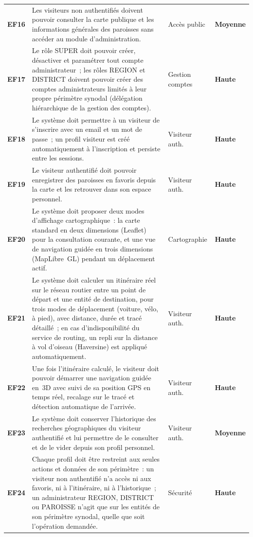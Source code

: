 \documentclass[12pt, a4paper]{report}
\begin{document}
\begin{longtable}{%
  >{\bfseries\color{eccdarkgreen}}m{1.2cm}
  m{7.8cm}
  m{3.5cm}
  >{\centering\arraybackslash\bfseries}m{1.7cm}}
EF16 & Les visiteurs non authentifiés doivent pouvoir consulter la carte
  publique et les informations générales des paroisses sans accéder au module
  d'administration. & Accès public & Moyenne \\
\rowcolor{eeclightgreen!60}
EF17 & Le rôle SUPER doit pouvoir créer, désactiver et paramétrer tout
  compte administrateur~; les rôles REGION et DISTRICT doivent pouvoir
  créer des comptes administrateurs limités à leur propre périmètre
  synodal (délégation hiérarchique de la gestion des comptes). &
  Gestion comptes & Haute \\
EF18 & Le système doit permettre à un visiteur de s'inscrire avec un email
  et un mot de passe~; un profil visiteur est créé automatiquement à
  l'inscription et persiste entre les sessions. &
  Visiteur auth. & Haute \\
\rowcolor{eeclightgreen!60}
EF19 & Le visiteur authentifié doit pouvoir enregistrer des paroisses en
  favoris depuis la carte et les retrouver dans son espace personnel. &
  Visiteur auth. & Haute \\
EF20 & Le système doit proposer deux modes d'affichage cartographique~: la
  carte standard en deux dimensions (Leaflet) pour la consultation courante,
  et une vue de navigation guidée en trois dimensions (MapLibre~GL) pendant
  un déplacement actif. & Cartographie & Haute \\
\rowcolor{eeclightgreen!60}
EF21 & Le système doit calculer un itinéraire réel sur le réseau routier
  entre un point de départ et une entité de destination, pour trois modes
  de déplacement (voiture, vélo, à pied), avec distance, durée et tracé
  détaillé~; en cas d'indisponibilité du service de routing, un repli sur
  la distance à vol d'oiseau (Haversine) est appliqué automatiquement. &
  Visiteur auth. & Haute \\
EF22 & Une fois l'itinéraire calculé, le visiteur doit pouvoir démarrer une
  navigation guidée en~3D avec suivi de sa position GPS en temps réel,
  recalage sur le tracé et détection automatique de l'arrivée. &
  Visiteur auth. & Haute \\
\rowcolor{eeclightgreen!60}
EF23 & Le système doit conserver l'historique des recherches géographiques
  du visiteur authentifié et lui permettre de le consulter et de le vider
  depuis son profil personnel. &
  Visiteur auth. & Moyenne \\
EF24 & Chaque profil doit être restreint aux seules actions et données de
  son périmètre~: un visiteur non authentifié n'a accès ni aux favoris, ni
  à l'itinéraire, ni à l'historique~; un administrateur REGION, DISTRICT ou
  PAROISSE n'agit que sur les entités de son périmètre synodal, quelle que
  soit l'opération demandée. &
  Sécurité & Haute \\
\end{longtable}
\end{document}
